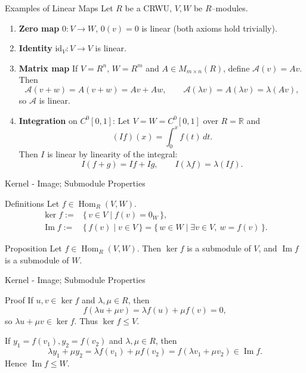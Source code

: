 \begin{frame}{Examples of Linear Maps}
Let $R$ be a CRWU, $V,W$ be $R$–modules.
\begin{enumerate}
  \item \textbf{Zero map} $0:V\to W$, $0(v)=0$ is linear (both axioms hold trivially).
  \item \textbf{Identity} $\mathrm{id}_V:V\to V$ is linear.
  \item \textbf{Matrix map} If $V=R^n$, $W=R^m$ and $A\in M_{m\times n}(R)$, define $\mathcal A(v)=Av$. Then
  \[
  \mathcal A(v+w)=A(v+w)=Av+Aw,\qquad \mathcal A(\lambda v)=A(\lambda v)=\lambda (Av),
  \]
  so $\mathcal A$ is linear.
  \item \textbf{Integration} on $C^0[0,1]$: Let $V=W=C^0[0,1]$ over $R=\mathbb{R}$ and
  \[
  (I f)(x)=\int_0^x f(t)\,dt.
  \]
  Then $I$ is linear by linearity of the integral:
  \[
  I(f+g)=If+Ig,\qquad I(\lambda f)=\lambda (If).
  \]
\end{enumerate}
\end{frame}


\begin{frame}{Kernel - Image; Submodule Properties}

\begin{block}{Definitions}
Let $f\in \operatorname{Hom}_R(V,W)$.
\begin{align*}
    \ker f :=& \{\, v\in V \mid f(v)=0_W \,\}, \\
\operatorname{Im} f :=& \{\, f(v)\mid v\in V \,\} = \{\, w\in W \mid \exists v\in V,\ w=f(v)\,\}.
\end{align*}

\end{block}

\begin{block}{Proposition} Let $f\in \operatorname{Hom}_R(V,W)$. Then
$\ker f$ is a submodule of $V$, and $\operatorname{Im} f$ is a submodule of $W$.
\end{block}


\end{frame}

\begin{frame}{Kernel - Image; Submodule Properties}
\begin{block}{Proof}
If $u,v\in \ker f$ and $\lambda,\mu\in R$, then
\[
f(\lambda u+\mu v)=\lambda f(u)+\mu f(v)=0,
\]
so $\lambda u+\mu v\in\ker f$. Thus $\ker f\le V$.

If $y_1=f(v_1), y_2=f(v_2)$ and $\lambda,\mu\in R$, then
\[
\lambda y_1+\mu y_2=\lambda f(v_1)+\mu f(v_2)=f(\lambda v_1+\mu v_2)\in \operatorname{Im} f.
\]
Hence $\operatorname{Im} f\le W$.
\end{block}
\end{frame}


